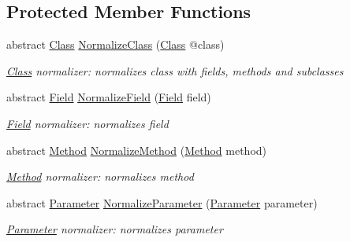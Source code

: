 \subsection*{Protected Member Functions}
\begin{DoxyCompactItemize}
\item 
abstract \mbox{\hyperlink{classCodeGen_1_1generators_1_1Class}{Class}} \mbox{\hyperlink{classCodeGen_1_1generators_1_1Normalizer_ae79262a7509b9d78393262dccf63dcc5}{Normalize\+Class}} (\mbox{\hyperlink{classCodeGen_1_1generators_1_1Class}{Class}} @class)
\begin{DoxyCompactList}\small\item\em \mbox{\hyperlink{classCodeGen_1_1generators_1_1Class}{Class}} normalizer\+: normalizes class with fields, methods and subclasses \end{DoxyCompactList}\item 
abstract \mbox{\hyperlink{classCodeGen_1_1generators_1_1Field}{Field}} \mbox{\hyperlink{classCodeGen_1_1generators_1_1Normalizer_aafd7bd1d143fb2082a0e4ef53fcbb46b}{Normalize\+Field}} (\mbox{\hyperlink{classCodeGen_1_1generators_1_1Field}{Field}} field)
\begin{DoxyCompactList}\small\item\em \mbox{\hyperlink{classCodeGen_1_1generators_1_1Field}{Field}} normalizer\+: normalizes field \end{DoxyCompactList}\item 
abstract \mbox{\hyperlink{classCodeGen_1_1generators_1_1Method}{Method}} \mbox{\hyperlink{classCodeGen_1_1generators_1_1Normalizer_a68a4b1c8b53e9ce28507430412cb310e}{Normalize\+Method}} (\mbox{\hyperlink{classCodeGen_1_1generators_1_1Method}{Method}} method)
\begin{DoxyCompactList}\small\item\em \mbox{\hyperlink{classCodeGen_1_1generators_1_1Method}{Method}} normalizer\+: normalizes method \end{DoxyCompactList}\item 
abstract \mbox{\hyperlink{classCodeGen_1_1generators_1_1Parameter}{Parameter}} \mbox{\hyperlink{classCodeGen_1_1generators_1_1Normalizer_a981da1c9b6b487ba3043e538a4991000}{Normalize\+Parameter}} (\mbox{\hyperlink{classCodeGen_1_1generators_1_1Parameter}{Parameter}} parameter)
\begin{DoxyCompactList}\small\item\em \mbox{\hyperlink{classCodeGen_1_1generators_1_1Parameter}{Parameter}} normalizer\+: normalizes parameter \end{DoxyCompactList}\end{DoxyCompactItemize}


